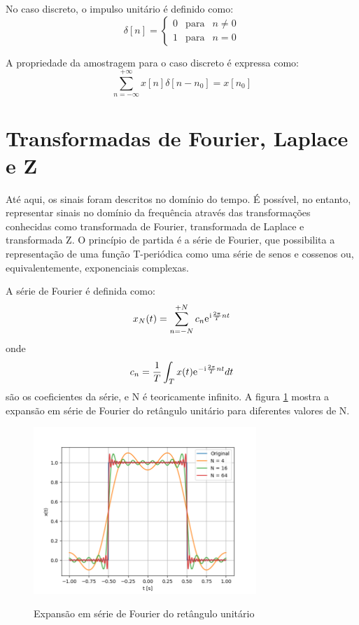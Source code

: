 \documentclass[12pt,a4paper]{report}
\newcommand{\I}{{\mathrm{i}\mkern1mu}}
\newcommand{\euler}{{\mathrm{e}\mkern1mu}}
\begin{document}
  No caso discreto, o impulso unitário é definido como:
  \begin{equation}
    \delta[n] =
      \left
      \{
      \begin{array}{rcl}
        0 & \mbox{para} & n \neq 0 \\
        1 & \mbox{para} & n = 0
      \end{array}
      \right.
  \end{equation}

  A propriedade da amostragem para o caso discreto é expressa como:
  \begin{equation}
    \sum_{n = -\infty}^{+\infty} x[n] \delta[n-n_0] = x[n_0]
  \end{equation}

\section{Transformadas de Fourier, Laplace e Z}
  Até aqui, os sinais foram descritos no domínio do tempo. É possível, no entanto, representar sinais no
  domínio da frequência através das transformações conhecidas como transformada de Fourier, transformada de
  Laplace e transformada Z. O princípio de partida é a série de Fourier, que possibilita a representação de uma
  função T-periódica como uma série de senos e cossenos ou, equivalentemente, exponenciais complexas.

  A série de Fourier é definida como:
  \begin{equation}
    x_N(t) = \sum_{n = -N}^{+N} c_n \euler^{\I \frac{2 \pi}{T} n t}
  \end{equation}
  onde
  \begin{equation}
    c_n = \frac{1}{T} \int_T x(t) \euler^{-\I \frac{2 \pi}{T} n t} dt
  \end{equation}
  são os coeficientes da série, e N é teoricamente infinito. A figura \ref{fig:fourier} mostra a expansão
  em série de Fourier do retângulo unitário para diferentes valores de N.
  \begin{figure}[H]
    \caption{Expansão em série de Fourier do retângulo unitário}
    \centering
    \includegraphics[width=0.75\textwidth]{fourier_series}
    \label{fig:fourier}
  \end{figure}
\end{document}
